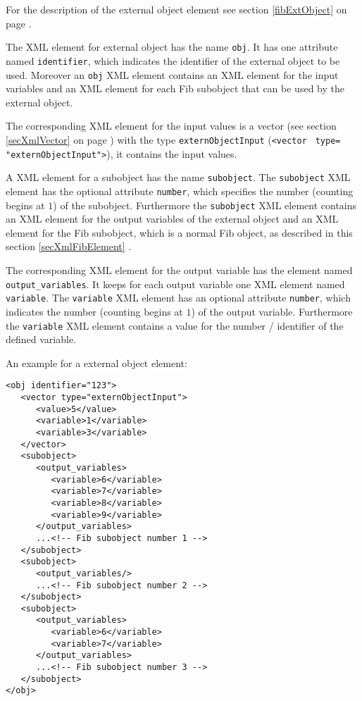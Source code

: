 For the description of the external object element see section \ref{fibExtObject} on page \pageref{fibExtObject} .

The XML element for external object has the name \verb|obj|. It has one attribute named \verb|identifier|, which indicates the identifier of the external object to be used. Moreover an \verb|obj| XML element contains an XML element for the input variables and an XML element for each Fib subobject that can be used by the external object.

The corresponding XML element for the input values is a vector (see section \ref{secXmlVector} on page \pageref{secXmlVector}) with the type \verb|externObjectInput| (\verb|<vector | \verb|type=| \verb|"externObjectInput">|), it contains the input values.

A XML element for a subobject has the name \verb|subobject|. The \verb|subobject| XML element has the optional attribute \verb|number|, which specifies the number (counting begins at $1$) of the subobject. Furthermore the \verb|subobject| XML element contains an XML element for the output variables of the external object and an XML element for the Fib subobject, which is a normal Fib object, as described in this section \ref{secXmlFibElement} .

The corresponding XML element for the output variable has the element named \verb|output_variables|. It keeps for each output variable one XML element named \verb|variable|. The \verb|variable| XML element has an optional attribute \verb|number|, which indicates the number (counting begins at $1$) of the output variable. Furthermore the \verb|variable| XML element contains a value for the number / identifier of the defined variable.

\bigskip\noindent
An example for a external object element:
\begin{verbatim}
<obj identifier="123">
   <vector type="externObjectInput">
      <value>5</value>
      <variable>1</variable>
      <variable>3</variable>
   </vector>
   <subobject>
      <output_variables>
         <variable>6</variable>
         <variable>7</variable>
         <variable>8</variable>
         <variable>9</variable>
      </output_variables>
      ...<!-- Fib subobject number 1 -->
   </subobject>
   <subobject>
      <output_variables/>
      ...<!-- Fib subobject number 2 -->
   </subobject>
   <subobject>
      <output_variables>
         <variable>6</variable>
         <variable>7</variable>
      </output_variables>
      ...<!-- Fib subobject number 3 -->
   </subobject>
</obj>
\end{verbatim}

